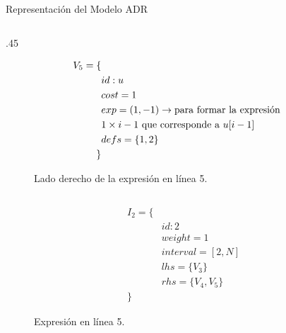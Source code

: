 \begin{frame}[fragile]{Representación del Modelo ADR}
{\begin{columns}[T]
  \hfill

  \begin{column}{.45\textwidth}
    \begin{figure}[ht]
      \captionsetup[figure]{font=footnotesize}
      \begin{equation*}
      \begin{split}
        V_5 = \{ \\
        & id:u \\
        & cost = 1 \\
        & exp = (1, -1) \rightarrow {\color{black}\text{para formar la expresión }} \\
        & 1 \times i - 1 {\color{black}\text{ que corresponde a }} u[i - 1]\\
        & defs = \{1, 2\} \\
        \}
      \end{split}
      \end{equation*}
      \captionsetup{font=scriptsize}
      \caption{Lado derecho de la expresión en línea 5.}
    \end{figure}
  \end{column}
\end{columns}
}

\pause

 {
  \begin{figure}
    \scriptsize
    \begin{equation*}
      \begin{split}
      I_2 = \{ \\
      & id: 2 \\
      & weight = 1 \\
      & interval = [2, N]\\
      & lhs = \{ V_3 \} \\
      & rhs = \{ V_4, V_5 \} \\
      \}
    \end{split}
  \end{equation*}
  \captionsetup{font=scriptsize}
  \caption{Expresión en línea 5.}
\end{figure}
}

\end{frame}


